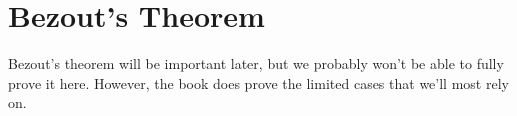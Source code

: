 \section{Bezout's Theorem}
Bezout's theorem will be important later, but we
probably won't be able to fully prove it here. However,
the book does prove the limited cases that we'll most rely on.
